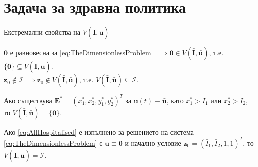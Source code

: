 \section{\hspace{1em}Задача за здравна политика}

\begin{frame}[t]{Екстремални свойства на $V(\bar{\boldsymbol{I}}, \bar{\boldsymbol{u}})$}

  $\pmb{0}$ е равновесна за \eqref{eq:TheDimensionlessProblem} $\implies \pmb{0} \in V(\bar{\boldsymbol{I}}, \bar{\boldsymbol{u}})$, т.е.  $ \{\pmb{0}\} \subseteq V(\bar{\boldsymbol{I}}, \bar{\boldsymbol{u}})$. \\
  $\boldsymbol{z}_0 \notin \mathcal{I} \implies \boldsymbol{z}_0 \notin V(\bar{\boldsymbol{I}}, \bar{\boldsymbol{u}})$, т.е. $V(\bar{\boldsymbol{I}}, \bar{\boldsymbol{u}}) \subseteq \mathcal{I}$.

  \begin{proposition}
    Ако съществува $\boldsymbol{E}^* = (x_1^*, x_2^*, y_1^*, y_2^*)^T$ за $\boldsymbol{u}(t) \equiv \bar{\boldsymbol{u}}$, като $x_1^* > \bar{I}_1$ или $x_2^* > \bar{I}_2$, то $V(\bar{\boldsymbol{I}}, \bar{\boldsymbol{u}}) = \{\pmb{0}\}$.
  \end{proposition}


  
  \begin{proposition}
    Ако \eqref{eq:AllHospitalised} е изпълнено за решението на система \eqref{eq:TheDimensionlessProblem} с $\boldsymbol{u} \equiv \pmb{0}$ и начално условие $\boldsymbol{z}_0 = (\bar{I}_1, \bar{I}_2, 1, 1)^T$, то $V(\bar{\boldsymbol{I}}, \bar{\boldsymbol{u}}) = \mathcal{I}$.
  \end{proposition}

\end{frame}


